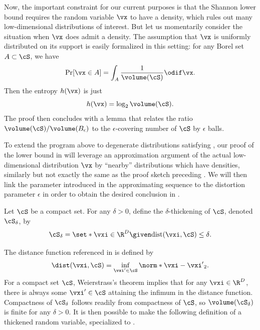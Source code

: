 \documentclass[../../book-main.tex]{subfiles}
\begin{document}
Now, the important constraint for our current purposes is that the Shannon lower
bound requires the random variable $\vx$ to have a density, which rules out many
low-dimensional distributions of interest.
But let us momentarily consider the situation when $\vx$ does admit a density.
The assumption that $\vx$ is uniformly distributed on its support is easily
formalized in this setting: for any Borel set $A \subset \cS$, we have
\begin{equation}
    \Pr[\vx \in A] = \int_{A} \frac{1}{\volume(\cS)} \odif \vx.
\end{equation}
Then the entropy $h(\vx)$ is just
\begin{equation}
    h(\vx) = \log_2 \volume(\cS).
\end{equation}
The proof then concludes with a lemma that relates the ratio $\volume(\cS)
/ \volume(B_{\epsilon})$ to the $\epsilon$-covering number of $\cS$ by
$\epsilon$ balls.

To extend the program above to degenerate distributions satisfying
,
our proof of the lower bound in  will
leverage an approximation argument of the actual low-dimensional
distribution $\vx$ by ``nearby'' distributions which have
densities, similarly but not exactly the same as the proof sketch
preceding .
We will then link the parameter introduced in
the approximating sequence to the distortion parameter $\epsilon$ in order to
obtain the desired conclusion in .

\begin{definition}\label{def:thickening-set}
    Let $\cS$ be a compact set.
    For any $\delta > 0$, define the $\delta$-thickening of $\cS$, denoted
    $\cS_{\delta}$, by
    \begin{equation}
        \cS_{\delta} = \set*{\vxi \in \R^D \given \mathrm{dist}(\vxi, \cS) \leq
        \delta}.
    \end{equation}
\end{definition}
The distance function referenced in  is defined by
\begin{equation}\label{eq:dist-func}
    \dist(\vxi, \cS) = \inf_{\vxi' \in \cS} \norm*{\vxi - \vxi'}_2.
\end{equation}
For a compact set $\cS$, Weierstrass's theorem implies that for any $\vxi \in
\R^D$, there is always some $\vxi' \in \cS$ attaining the infimum in
the distance
function.
Compactness of $\cS_{\delta}$ follows readily from compactness of $\cS$, so
$\volume(\cS_{\delta})$ is finite for any $\delta > 0$. It is then possible to
make the following definition of a thickened random variable, specialized to
.
\end{document}
